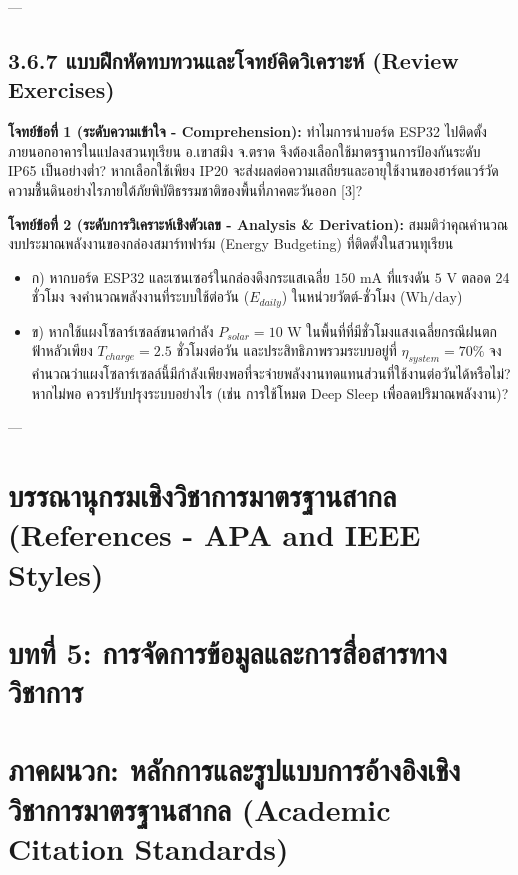 \documentclass[11pt,a4paper,openany]{report}
\begin{document}
---

\section{3.6.7 แบบฝึกหัดทบทวนและโจทย์คิดวิเคราะห์ (Review Exercises)}


\textbf{โจทย์ข้อที่ 1 (ระดับความเข้าใจ - Comprehension):}
ทำไมการนำบอร์ด ESP32 ไปติดตั้งภายนอกอาคารในแปลงสวนทุเรียน อ.เขาสมิง จ.ตราด จึงต้องเลือกใช้มาตรฐานการป้องกันระดับ IP65 เป็นอย่างต่ำ? หากเลือกใช้เพียง IP20 จะส่งผลต่อความเสถียรและอายุใช้งานของฮาร์ดแวร์วัดความชื้นดินอย่างไรภายใต้ภัยพิบัติธรรมชาติของพื้นที่ภาคตะวันออก [3]?

\textbf{โจทย์ข้อที่ 2 (ระดับการวิเคราะห์เชิงตัวเลข - Analysis \& Derivation):}
สมมติว่าคุณคำนวณงบประมาณพลังงานของกล่องสมาร์ทฟาร์ม (Energy Budgeting) ที่ติดตั้งในสวนทุเรียน
\begin{itemize}
  \item ก) หากบอร์ด ESP32 และเซนเซอร์ในกล่องดึงกระแสเฉลี่ย $150\text{ mA}$ ที่แรงดัน $5\text{ V}$ ตลอด 24 ชั่วโมง จงคำนวณพลังงานที่ระบบใช้ต่อวัน ($E_{daily}$) ในหน่วยวัตต์-ชั่วโมง ($\text{Wh/day}$)
  \item ข) หากใช้แผงโซลาร์เซลล์ขนาดกำลัง $P_{solar} = 10\text{ W}$ ในพื้นที่ที่มีชั่วโมงแสงเฉลี่ยกรณีฝนตกฟ้าหลัวเพียง $T_{charge} = 2.5\text{ ชั่วโมงต่อวัน}$ และประสิทธิภาพรวมระบบอยู่ที่ $\eta_{system} = 70\%$ จงคำนวณว่าแผงโซลาร์เซลล์นี้มีกำลังเพียงพอที่จะจ่ายพลังงานทดแทนส่วนที่ใช้งานต่อวันได้หรือไม่? หากไม่พอ ควรปรับปรุงระบบอย่างไร (เช่น การใช้โหมด Deep Sleep เพื่อลดปริมาณพลังงาน)?
\end{itemize}



---

\chapter*{บรรณานุกรมเชิงวิชาการมาตรฐานสากล (References - APA and IEEE Styles)}


\chapter{บทที่ 5: การจัดการข้อมูลและการสื่อสารทางวิชาการ}

\chapter*{ภาคผนวก: หลักการและรูปแบบการอ้างอิงเชิงวิชาการมาตรฐานสากล (Academic Citation Standards)}
\end{document}

